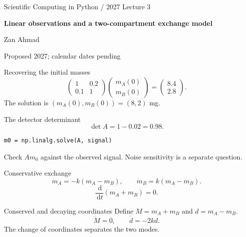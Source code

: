 \documentclass[aspectratio=169,11pt]{beamer}
\providecommand{\dd}{\,\mathrm{d}}\providecommand{\R}{\mathbb{R}}
\newcommand{\notestarget}{notes.pdf}\newcommand{\noteslabel}{Notes}
\begin{document}
\begin{frame}[plain]\vfill
{\small\color{accent} Scientific Computing in Python / 2027 \quad Lecture 3}\par\medskip
{\raggedright{}\LARGE\bfseries\color{ink} Linear observations and a two-compartment exchange model}\par\bigskip
Zan Ahmad\par\smallskip
{\small Proposed 2027; calendar dates pending}\par\vfill\end{frame}
\renewcommand{\notestarget}{notes.pdf\#note-recovering-the-initial-masses}
\begin{frame}[t,fragile,label=slide-recovering-the-initial-masses]{Recovering the initial masses}
\[
\begin{pmatrix}1&0.2\\0.1&1\end{pmatrix}
\begin{pmatrix}m_A(0)\\m_B(0)\end{pmatrix}
=\begin{pmatrix}8.4\\2.8\end{pmatrix}.
\]
\pause{}
The solution is $(m_A(0),m_B(0))=(8,2)$ mg.
\end{frame}
\renewcommand{\notestarget}{notes.pdf\#note-recovering-the-initial-masses}
\begin{frame}[t,fragile,label=slide-the-detector-determinant]{The detector determinant}
\[
\det A=1-0.02=0.98.
\]
\pause{}
\begin{verbatim}
m0 = np.linalg.solve(A, signal)
\end{verbatim}
Check $Am_0$ against the observed signal. Noise sensitivity is a separate question.
\end{frame}
\renewcommand{\notestarget}{notes.pdf\#note-conservative-exchange}
\begin{frame}[t,fragile,label=slide-conservative-exchange]{Conservative exchange}
\[
\dot m_A=-k(m_A-m_B),\qquad \dot m_B=k(m_A-m_B).
\]
\pause{}
\[
\frac{\dd}{\dd t}(m_A+m_B)=0.
\]
\end{frame}
\renewcommand{\notestarget}{notes.pdf\#note-conservative-exchange}
\begin{frame}[t,fragile,label=slide-conserved-and-decaying-coordinates]{Conserved and decaying coordinates}
Define $M=m_A+m_B$ and $d=m_A-m_B$.
\pause{}
\[
\dot M=0,\qquad \dot d=-2kd.
\]
The change of coordinates separates the two modes.
\end{frame}
\end{document}
